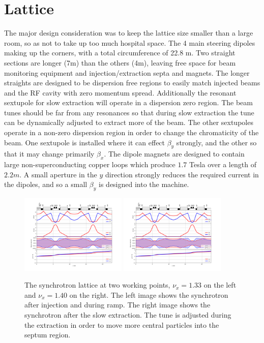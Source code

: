 \section{Lattice}
The major design consideration was to keep the lattice size smaller than a large room, so as not to take up too much hospital space.  
The 4 main steering dipoles making up the
corners, with a total circumference of 22.8 m.  Two straight sections are longer (7m) than the others (4m), leaving free space for beam 
monitoring equipment and injection/extraction septa and magnets.  The longer straights are designed to be dispersion free regions to easily match injected beams
and the RF cavity with zero momentum spread.  Additionally the resonant sextupole for slow extraction will operate in a dispersion zero region.
The beam tunes should be far from any resonances so that during slow extraction the tune can be dynamically adjusted to extract more of the beam.
The other sextupoles operate in a non-zero dispersion region in order to change the chromaticity of the beam.  One sextupole is installed where it can effect
$\beta_y$ strongly, and the other so that it may change primarily $\beta_x$.  The dipole magnets are designed to contain large non-superconducting copper loops
which produce $1.7$ Tesla over a length of $2.2 m$. A small aperture in the $y$ direction strongly reduces the required current in the dipoles, and so a small 
$\beta_y$ is designed into the machine.  
\begin{figure}[h] 
  \begin{center}
    \includegraphics[width=0.45\textwidth]{twiss_33.png}
    \includegraphics[width=0.45\textwidth]{twiss_40.png}
    \caption{The synchrotron lattice at two working points, $\nu_x = 1.33$ on the left and $\nu_x = 1.40$ on the right. 
      The left image shows the synchrotron after injection and during ramp.  The right
      image shows the synchrotron after the slow extraction.  The tune is adjusted during the extraction in order to move more central particles into
    the septum region. }

  \end{center}
  \label{fig:lat}
\end{figure}


